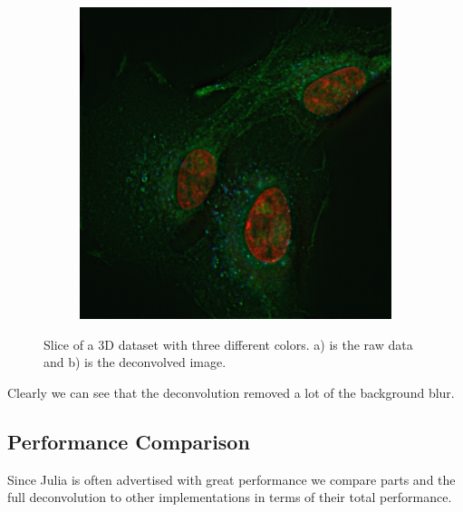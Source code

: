 \documentclass{juliacon}
\begin{document}
\begin{figure}[h]
\begin{subfigure}{.25\textwidth}
                \includegraphics[width = .95\textwidth]{figures/deconvolved_rgb.png}
            \end{subfigure}
            \caption{Slice of a 3D dataset with three different colors. a) is the raw data and b) is the
                    deconvolved image.}
            \label{fig:result_3d}
        \end{figure} 
        Clearly we can see that the deconvolution removed a lot of the background blur.

    \subsection{Performance Comparison}
        Since Julia is often advertised with great performance we compare parts and the full deconvolution to other implementations in
        terms of their total performance.
\end{document}
